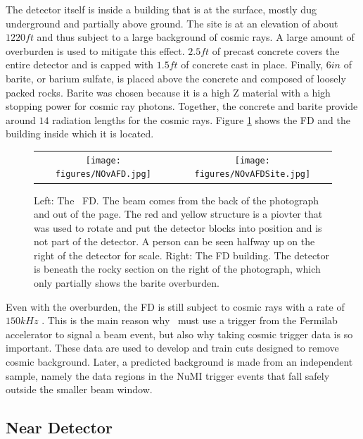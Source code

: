 The detector itself is inside a building that is at the surface, mostly dug underground and partially above ground. The site is at an elevation of about $1220\unit{ft}$ and thus subject to a large background of cosmic rays. A large amount of overburden is used to mitigate this effect. $2.5\unit{ft}$ of precast concrete covers the entire detector and is capped with $1.5\unit{ft}$ of concrete cast in place. Finally, $6\unit{in}$ of barite, or barium sulfate, is placed above the concrete and composed of loosely packed rocks. Barite was chosen because it is a high Z material with a high stopping power for cosmic ray photons. Together, the concrete and barite provide around $14$ radiation lengths for the cosmic rays. Figure \ref{fig:FD} shows the FD and the building inside which it is located.
\begin{figure}[htb]
  \centering
  \begin{tabular}{c c}
    \texttt{[image: figures/NOvAFD.jpg]} &
    \texttt{[image: figures/NOvAFDSite.jpg]} \\
  \end{tabular}
  \caption[The \nova~Far Detector]{Left: The \nova~FD. The beam comes from the back of the photograph and out of the page. The red and yellow structure is a piovter that was used to rotate and put the detector blocks into position and is not part of the detector. A person can be seen halfway up on the right of the detector for scale. Right: The FD building. The detector is beneath the rocky section on the right of the photograph, which only partially shows the barite overburden.}
  \label{fig:FD}
\end{figure}

Even with the overburden, the FD is still subject to cosmic rays with a rate of $150\unit{kHz}$ \cite{ref:JETPNC}. This is the main reason why \nova~must use a trigger from the Fermilab accelerator to signal a beam event, but also why taking cosmic trigger data is so important. These data are used to develop and train cuts designed to remove cosmic background. Later, a predicted background is made from an independent sample, namely the data regions in the NuMI trigger events that fall safely outside the smaller beam window.

\subsection{Near Detector}

